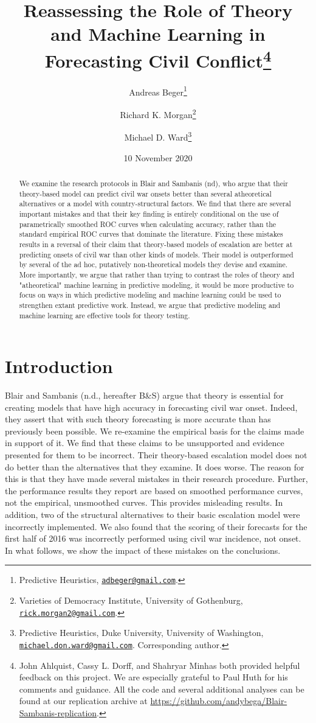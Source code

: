 \documentclass[
]{article}
\title{Reassessing the Role of Theory and Machine Learning in Forecasting Civil Conflict\thanks{John Ahlquist, Cassy L. Dorff, and Shahryar Minhas both provided helpful feedback on this project. We are especially grateful to Paul Huth for his comments and guidance. All the code and several additional analyses can be found at our replication archive at \url{https://github.com/andybega/Blair-Sambanis-replication}.}}
\author{Andreas Beger\footnote{Predictive Heuristics, \href{mailto:adbeger@gmail.com}{\nolinkurl{adbeger@gmail.com}}.} \and Richard K. Morgan\footnote{Varieties of Democracy Institute, University of Gothenburg, \href{mailto:rick.morgan2@gmail.com}{\nolinkurl{rick.morgan2@gmail.com}}.} \and Michael D. Ward\footnote{Predictive Heuristics, Duke University, University of Washington, \href{mailto:michael.don.ward@gmail.com}{\nolinkurl{michael.don.ward@gmail.com}}. Corresponding author.}}
\date{10 November 2020}
\begin{document}
\maketitle
\begin{abstract}
We examine the research protocols in Blair and Sambanis (nd), who argue that their theory-based model can predict civil war onsets better than several atheoretical alternatives or a model with country-structural factors. We find that there are several important mistakes and that their key finding is entirely conditional on the use of parametrically smoothed ROC curves when calculating accuracy, rather than the standard empirical ROC curves that dominate the literature. Fixing these mistakes results in a reversal of their claim that theory-based models of escalation are better at predicting onsets of civil war than other kinds of models. Their model is outperformed by several of the ad hoc, putatively non-theoretical models they devise and examine. More importantly, we argue that rather than trying to contrast the roles of theory and "atheoretical" machine learning in predictive modeling, it would be more productive to focus on ways in which predictive modeling and machine learning could be used to strengthen extant predictive work. Instead, we argue that predictive modeling and machine learning are effective tools for theory testing.
\end{abstract}

\hypertarget{introduction}{%
\section{Introduction}\label{introduction}}

Blair and Sambanis (n.d., hereafter B\&S) argue that theory is essential for creating models that have high accuracy in forecasting civil war onset. Indeed, they assert that with such theory forecasting is more accurate than has previously been possible. We re-examine the empirical basis for the claims made in support of it. We find that these claims to be unsupported and evidence presented for them to be incorrect. Their theory-based escalation model does not do better than the alternatives that they examine. It does worse. The reason for this is that they have made several mistakes in their research procedure. Further, the performance results they report are based on smoothed performance curves, not the empirical, unsmoothed curves. This provides misleading results. In addition, two of the structural alternatives to their basic escalation model were incorrectly implemented. We also found that the scoring of their forecasts for the first half of 2016 was incorrectly performed using civil war incidence, not onset. In what follows, we show the impact of these mistakes on the conclusions.
\end{document}
